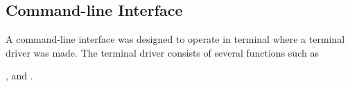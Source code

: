 \subsection{Command-line Interface}

A command-line interface was designed to operate in terminal where a terminal driver
was made. The terminal driver consists of several functions such as 

, 
 and . 